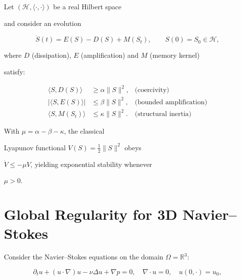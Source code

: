 \documentclass[11pt,a4paper]{amsart}
\newcommand{\alphacoeff}{\ensuremath{\alpha}}
\newcommand{\betacoeff}{\ensuremath{\beta}}
\newcommand{\kappacoeff}{\ensuremath{\kappa}}
\newcommand{\mumargin}{\ensuremath{\mu}}
\begin{document}
Let $(\mathcal{H},\langle\cdot,\cdot\rangle)$ be a real Hilbert space

and consider an evolution

\[

  \dot{S}(t)=E(S)-D(S)+M(S_t),

  \qquad S(0)=S_0\in\mathcal{H},

\]

where $D$ (dissipation), $E$ (amplification) and $M$ (memory kernel)

satisfy:

\begin{align}

  \langle S,D(S)\rangle &\ge \alphacoeff\|S\|^{2},

  &\text{(coercivity)}\\

  |\langle S,E(S)\rangle| &\le \betacoeff\|S\|^{2},

  &\text{(bounded amplification)}\\

  \langle S,M(S_t)\rangle &\le \kappacoeff\|S\|^{2}.

  &\text{(structural inertia)}

\end{align}

With $\mumargin=\alphacoeff-\betacoeff-\kappacoeff$, the classical

Lyapunov functional $V(S)=\tfrac12\|S\|^{2}$ obeys

$\dot V\le -\mumargin V$, yielding exponential stability whenever

$\mumargin>0$.





\section{Global Regularity for 3D Navier--Stokes}

Consider the Navier--Stokes equations on the domain $\Omega = \mathbb{R}^3$:

\begin{equation}

    \partial_t u + (u \cdot \nabla) u - \nu \Delta u + \nabla p = 0, 

    \quad \nabla \cdot u = 0, 

    \quad u(0, \cdot) = u_0,

\end{equation}
\end{document}
